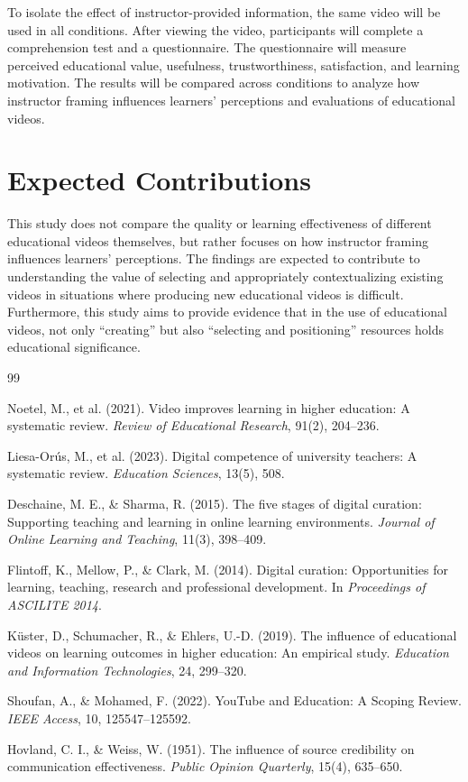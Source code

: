 \documentclass[a4paper,11pt]{article}
\begin{document}
To isolate the effect of instructor-provided information, the same video will be used in all conditions.
After viewing the video, participants will complete a comprehension test and a questionnaire. The questionnaire will measure perceived educational value, usefulness, trustworthiness, satisfaction, and learning motivation.
The results will be compared across conditions to analyze how instructor framing influences learners’ perceptions and evaluations of educational videos.

\section{Expected Contributions}

This study does not compare the quality or learning effectiveness of different educational videos themselves, but rather focuses on how instructor framing influences learners’ perceptions.
The findings are expected to contribute to understanding the value of selecting and appropriately contextualizing existing videos in situations where producing new educational videos is difficult.
Furthermore, this study aims to provide evidence that in the use of educational videos, not only “creating” but also “selecting and positioning” resources holds educational significance.


\begin{thebibliography}{99}

Noetel, M., et al. (2021).
Video improves learning in higher education: A systematic review.
\textit{Review of Educational Research}, 91(2), 204--236.

Liesa-Orús, M., et al. (2023).
Digital competence of university teachers: A systematic review.
\textit{Education Sciences}, 13(5), 508.

Deschaine, M. E., \& Sharma, R. (2015).
The five stages of digital curation: Supporting teaching and learning in online learning environments.
\textit{Journal of Online Learning and Teaching}, 11(3), 398--409.

Flintoff, K., Mellow, P., \& Clark, M. (2014).
Digital curation: Opportunities for learning, teaching, research and professional development.
In \textit{Proceedings of ASCILITE 2014}.

Küster, D., Schumacher, R., \& Ehlers, U.-D. (2019).
The influence of educational videos on learning outcomes in higher education: An empirical study.
\textit{Education and Information Technologies}, 24, 299--320.

Shoufan, A., \& Mohamed, F. (2022).
YouTube and Education: A Scoping Review.
\textit{IEEE Access}, 10, 125547--125592.

Hovland, C. I., \& Weiss, W. (1951).
The influence of source credibility on communication effectiveness.
\textit{Public Opinion Quarterly}, 15(4), 635--650.

\end{thebibliography}
\end{document}

